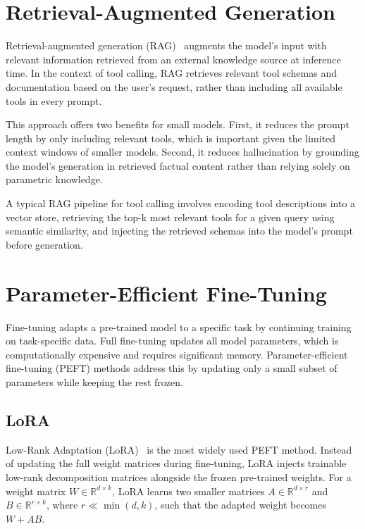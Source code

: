 \section{Retrieval-Augmented Generation}

Retrieval-augmented generation (RAG)~\cite{lewis2020retrieval} augments the model's input with relevant information retrieved from an external knowledge source at inference time. In the context of tool calling, RAG retrieves relevant tool schemas and documentation based on the user's request, rather than including all available tools in every prompt.

This approach offers two benefits for small models. First, it reduces the prompt length by only including relevant tools, which is important given the limited context windows of smaller models. Second, it reduces hallucination by grounding the model's generation in retrieved factual content rather than relying solely on parametric knowledge.

A typical RAG pipeline for tool calling involves encoding tool descriptions into a vector store, retrieving the top-k most relevant tools for a given query using semantic similarity, and injecting the retrieved schemas into the model's prompt before generation.

\section{Parameter-Efficient Fine-Tuning}

Fine-tuning adapts a pre-trained model to a specific task by continuing training on task-specific data. Full fine-tuning updates all model parameters, which is computationally expensive and requires significant memory. Parameter-efficient fine-tuning (PEFT) methods address this by updating only a small subset of parameters while keeping the rest frozen.

\subsection{LoRA}

Low-Rank Adaptation (LoRA)~\cite{hu2022lora} is the most widely used PEFT method. Instead of updating the full weight matrices during fine-tuning, LoRA injects trainable low-rank decomposition matrices alongside the frozen pre-trained weights. For a weight matrix $W \in \mathbb{R}^{d \times k}$, LoRA learns two smaller matrices $A \in \mathbb{R}^{d \times r}$ and $B \in \mathbb{R}^{r \times k}$, where $r \ll \min(d, k)$, such that the adapted weight becomes $W + AB$.

